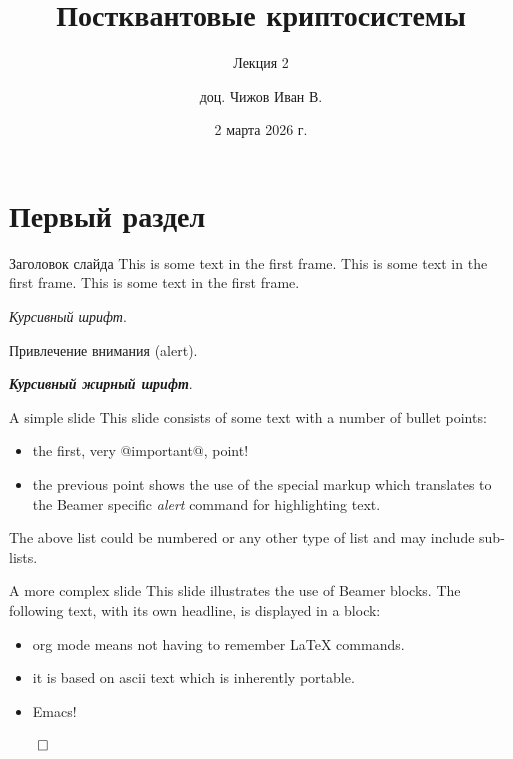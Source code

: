 \documentclass[aspectratio=169, 12pt]{beamer}
\author{доц. Чижов Иван В.}
\date{2 марта 2026 г.}
\title{Постквантовые криптосистемы}
\subtitle{Лекция 2}
\begin{document}
\maketitle
\begin{frame}{}
    \tableofcontents
\end{frame}

\section{Первый раздел}
\label{sec:org8e50edb}
\begin{frame}[label={sec:org57ae47a}]{Заголовок слайда}
    This is some text in the first frame. This is some text in the first
    frame. This is some text in the first frame.

    \emph{Курсивный шрифт}.

    \alert{Привлечение внимания (alert)}.

    \emph{\textbf{Курсивный жирный шрифт}}.
\end{frame}
\begin{frame}[label={sec:org73f8e8c}]{A simple slide}
    This slide consists of some text with a number of bullet points:

    \begin{itemize}
        \item the first, very @important@, point!
        \item the previous point shows the use of the special markup which
              translates to the Beamer specific \emph{alert} command for highlighting
              text.
    \end{itemize}


    The above list could be numbered or any other type of list and may
    include sub-lists.
\end{frame}
\begin{frame}[label={sec:org8a4a4d6}]{A more complex slide}
    This slide illustrates the use of Beamer blocks.  The following text,
    with its own headline, is displayed in a block:
    \begin{theorem}\label{sec:org7c76420}
        \begin{itemize}
            \item org mode means not having to remember \LaTeX{} commands.
            \item it is based on ascii text which is inherently portable.
            \item Emacs!
        \end{itemize}

        \hfill \(\qed\)
    \end{theorem}
\end{frame}
\end{document}
